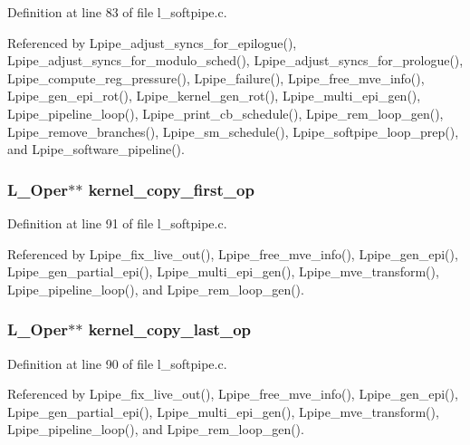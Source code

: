 Definition at line 83 of file l\_\-softpipe.c.

Referenced by Lpipe\_\-adjust\_\-syncs\_\-for\_\-epilogue(), Lpipe\_\-adjust\_\-syncs\_\-for\_\-modulo\_\-sched(), Lpipe\_\-adjust\_\-syncs\_\-for\_\-prologue(), Lpipe\_\-compute\_\-reg\_\-pressure(), Lpipe\_\-failure(), Lpipe\_\-free\_\-mve\_\-info(), Lpipe\_\-gen\_\-epi\_\-rot(), Lpipe\_\-kernel\_\-gen\_\-rot(), Lpipe\_\-multi\_\-epi\_\-gen(), Lpipe\_\-pipeline\_\-loop(), Lpipe\_\-print\_\-cb\_\-schedule(), Lpipe\_\-rem\_\-loop\_\-gen(), Lpipe\_\-remove\_\-branches(), Lpipe\_\-sm\_\-schedule(), Lpipe\_\-softpipe\_\-loop\_\-prep(), and Lpipe\_\-software\_\-pipeline().
\subsubsection{\setlength{\rightskip}{0pt plus 5cm}L\_\-Oper$\ast$$\ast$ \bf{kernel\_\-copy\_\-first\_\-op}}\label{l__softpipe__int_8h_394714920d405996c9ac56376596536a}




Definition at line 91 of file l\_\-softpipe.c.

Referenced by Lpipe\_\-fix\_\-live\_\-out(), Lpipe\_\-free\_\-mve\_\-info(), Lpipe\_\-gen\_\-epi(), Lpipe\_\-gen\_\-partial\_\-epi(), Lpipe\_\-multi\_\-epi\_\-gen(), Lpipe\_\-mve\_\-transform(), Lpipe\_\-pipeline\_\-loop(), and Lpipe\_\-rem\_\-loop\_\-gen().
\subsubsection{\setlength{\rightskip}{0pt plus 5cm}L\_\-Oper$\ast$$\ast$ \bf{kernel\_\-copy\_\-last\_\-op}}\label{l__softpipe__int_8h_43dd5bc461bab37b4dc35075227b76df}




Definition at line 90 of file l\_\-softpipe.c.

Referenced by Lpipe\_\-fix\_\-live\_\-out(), Lpipe\_\-free\_\-mve\_\-info(), Lpipe\_\-gen\_\-epi(), Lpipe\_\-gen\_\-partial\_\-epi(), Lpipe\_\-multi\_\-epi\_\-gen(), Lpipe\_\-mve\_\-transform(), Lpipe\_\-pipeline\_\-loop(), and Lpipe\_\-rem\_\-loop\_\-gen().
